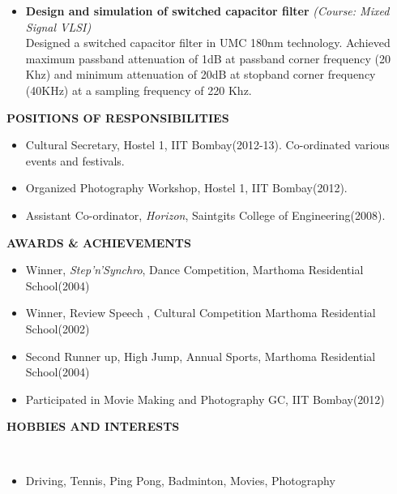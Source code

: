 \documentclass[a4paper,10pt]{article}
\begin{document}
\begin{itemize}
% 	
   \item \textbf{{Design and simulation of switched capacitor filter}} \textit{(Course: Mixed Signal VLSI)}\\
 	Designed a switched capacitor filter in UMC 180nm technology. Achieved maximum passband attenuation of 1dB at passband corner frequency (20 Khz)
 	and minimum attenuation of 20dB at stopband corner frequency (40KHz) at a sampling frequency of 220 Khz.  
 \end{itemize}
 

 \colorbox{titleColor}{\parbox{6.5in}{\textbf{POSITIONS OF RESPONSIBILITIES}}}
   \begin{itemize}
    \item Cultural Secretary, Hostel 1, IIT Bombay(2012-13). Co-ordinated various events and festivals.
    \item Organized Photography Workshop, Hostel 1, IIT Bombay(2012). 
    \item Assistant Co-ordinator, \textit{Horizon}, Saintgits College of Engineering(2008).
  \end{itemize}
%  
 \colorbox{titleColor}{\parbox{6.5in}{\textbf{AWARDS \& ACHIEVEMENTS}}}
  \begin{itemize}
  \item Winner, \textit{Step'n'Synchro}, Dance Competition, Marthoma Residential School(2004)
  \item Winner, Review Speech , Cultural Competition Marthoma Residential School(2002)
  \item Second Runner up, High Jump, Annual Sports,  Marthoma Residential School(2004)
  \item Participated in Movie Making and Photography GC, IIT Bombay(2012) 
  \end{itemize} 

 \colorbox{titleColor}{\parbox{6.5in}{\textbf{HOBBIES AND INTERESTS}}}\\
  \begin{itemize}
   \item Driving, Tennis, Ping Pong, Badminton, Movies, Photography
  \end{itemize}
\end{document}

